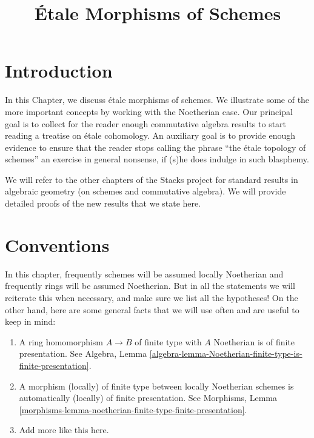 \documentclass{stacks-project}
\theoremstyle{plain}
\theoremstyle{definition}
\theoremstyle{remark}
\numberwithin{equation}{subsection}
\begin{document}
\title{\'Etale Morphisms of Schemes}

\maketitle

\label{section-phantom}

\tableofcontents



\section{Introduction}
\label{section-introduction}

\noindent
In this Chapter, we discuss \'etale morphisms of schemes. We illustrate
some of the more important concepts by working with the Noetherian case.
Our principal goal is to collect for the reader enough commutative
algebra results to start reading a treatise on \'etale cohomology. An
auxiliary goal is to provide enough evidence to ensure that the reader stops
calling the phrase ``the \'etale topology of schemes'' an exercise in general
nonsense, if (s)he does indulge in such blasphemy.

\medskip\noindent
We will refer to the other
chapters of the Stacks project for standard results in algebraic geometry
(on schemes and commutative algebra). We will provide detailed
proofs of the new results that we state here.




\section{Conventions}
\label{section-conventions}

\noindent
In this chapter, frequently schemes will be assumed locally Noetherian
and frequently rings will be assumed Noetherian. But in all the statements
we will reiterate this when necessary, and make sure we list all the
hypotheses! On the other hand, here are some general facts that we will use
often and are useful to keep in mind:
\begin{enumerate}
\item A ring homomorphism $A \to B$ of finite type with $A$ Noetherian
is of finite presentation. See Algebra,
Lemma \ref{algebra-lemma-Noetherian-finite-type-is-finite-presentation}.
\item A morphism (locally) of finite type between locally Noetherian schemes
is automatically (locally) of finite presentation.
See Morphisms,
Lemma \ref{morphisms-lemma-noetherian-finite-type-finite-presentation}.
\item Add more like this here.
\end{enumerate}
\end{document}
